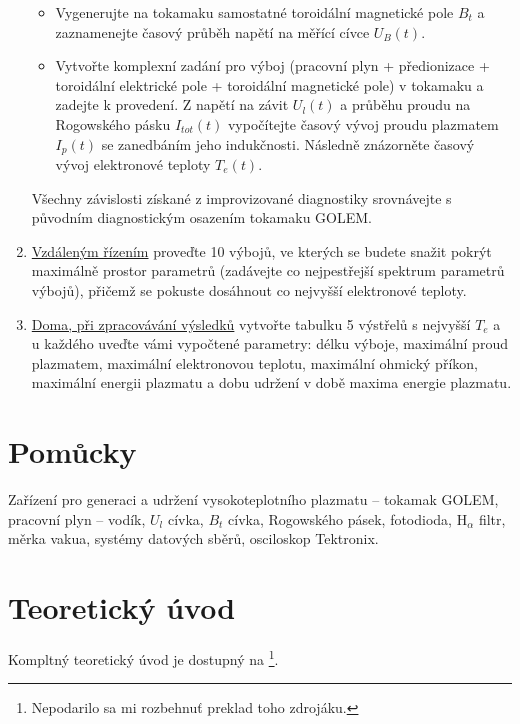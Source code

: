 \begin{enumerate}
\begin{itemize}
    \item Vygenerujte na tokamaku samostatné toroidální magnetické pole $B_t$ a  zaznamenejte časový průběh napětí na měřící cívce $U_B(t)$.
    \item Vytvořte komplexní zadání pro výboj (pracovní plyn + předionizace + toroidální elektrické pole + toroidální magnetické pole) v tokamaku a zadejte k provedení.  Z napětí na závit $U_l(t)$ a průběhu proudu na Rogowského pásku $I_{tot}(t)$ vypočítejte časový vývoj proudu plazmatem $I_p(t)$ se zanedbáním jeho indukčnosti. Následně znázorněte časový vývoj elektronové teploty $T_e(t)$.
    \end{itemize}
    \vspace{-1mm}
    Všechny závislosti získané z improvizované diagnostiky srovnávejte s původním diagnostickým osazením tokamaku GOLEM.
    \item  \underline{Vzdáleným řízením} proveďte 10 výbojů, ve kterých se budete snažit pokrýt maximálně  prostor parametrů (zadávejte co nejpestřejší spektrum parametrů výbojů), přičemž se pokuste  dosáhnout co nejvyšší elektronové teploty. 
    \item \underline{Doma, při zpracovávání výsledků} vytvořte tabulku 5 výstřelů s nejvyšší $T_e$ a u každého uveďte  vámi vypočtené parametry: délku výboje, maximální proud plazmatem, maximální elektronovou teplotu, maximální ohmický příkon, maximální energii plazmatu a dobu udržení v době maxima energie plazmatu.
   
\end{enumerate}

   
\section{Pomůcky}
 Zařízení pro generaci a udržení vysokoteplotního
plazmatu -- tokamak GOLEM, pracovní plyn -- vodík, $U_{l}$ cívka,
$B_t$ cívka, Rogowského pásek, fotodioda, H$_\alpha$ filtr, měrka vakua, systémy datových sběrů, osciloskop Tektronix.

\section{Teoretický úvod}
Kompltný teoretický úvod je dostupný na \cite{C_1}\footnote{Nepodarilo sa mi rozbehnuť preklad toho zdrojáku.}.




